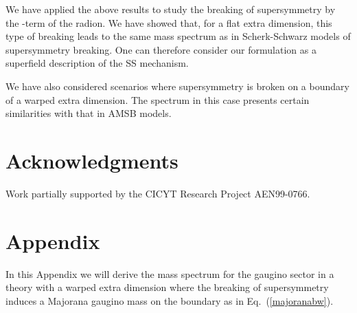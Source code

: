 \documentclass[a4paper,12pt]{article}
\begin{document}
We have applied the above results
 to study the breaking of supersymmetry
by the \coordHE{}-term of the radion.
We have showed that, 
for  a flat extra dimension,
this type of breaking
 leads to 
the same mass spectrum as 
in  Scherk-Schwarz  models of supersymmetry breaking.
One can therefore
consider our  formulation 
as a superfield description of the SS mechanism.

We have also considered scenarios where supersymmetry
is broken on a boundary of a warped extra dimension.
The spectrum in this case presents certain 
similarities with that
in AMSB
models.



\vskip2cm


\section*{Acknowledgments}


Work  partially supported by the CICYT Research Project
AEN99-0766.

\newpage

\section*{Appendix}

In this Appendix we will derive the mass spectrum  for the gaugino
sector in a theory with a warped extra dimension 
where the breaking of supersymmetry 
induces a 
Majorana gaugino mass on the boundary as in Eq.~(\ref{majoranabw}).
\end{document}
